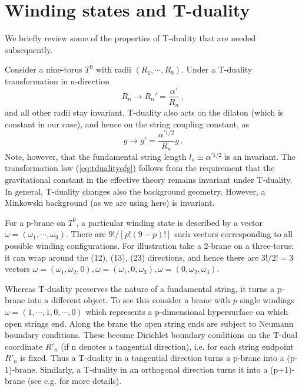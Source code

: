 \documentclass[a4paper,twocolumn,nofootinbib,tightenlines,prd,aps,
               superscriptaddress]{revtex4} %
\newcommand{\al}{\alpha}
\newcommand{\om}{\omega}
\newcommand{\ga}{\gamma}
\newcommand{\cP}{{\cal{P}}}
\begin{document}


\section{Winding states and T-duality}
\label{sec:tduality}

We briefly review some of the properties
of T-duality that are needed subsequently.

Consider a nine-torus $T^9$ with radii $(R_1,\cdots, R_9)$. Under
a T-duality transformation in n-direction
\begin{equation}\label{eq:tdualitydef}
    R_n \rightarrow R_n'=\frac{\al'}{R_n} \, ,
\end{equation}
and  all other radii stay invariant. T-duality also acts on the
dilaton (which is  constant in our case), and hence on the string
coupling constant, as
\begin{equation} \label{eq:tdualityofg}
    g \rightarrow g'=\frac{\al^{'1/2}}{R_n}g \, .
\end{equation}
Note, however, that the fundamental string length $l_s \equiv
\al^{'1/2}$ is an invariant. The transformation law
(\ref{eq:tdualityofg}) follows from the requirement that the
gravitational constant in the effective theory remains invariant
under T-duality. In general, T-duality changes also the background
geometry. However, a Minkowski background (as we are using here)
is invariant.

For a p-brane on $T^9$, a particular winding state is described by
a vector $\om = (\om_1,\cdots,\om_9)$. There are $9! / [p!
(9-p)!]$ such vectors corresponding to all possible winding
configurations. For illustration take a 2-brane on a three-torus:
it can wrap around the (12), (13), (23) directions, and hence
there are $3! / 2! = 3$ vectors $\om = (\om_1,\om_2,0),
\om=(\om_1,0,\om_3), \om=(0,\om_2,\om_3)$.

Whereas T-duality preserves the nature of a fundamental string, it
turns a p-brane into a different object. To see this consider a
brane with $p$ single windings $\om=(1,\cdots,1,0,\cdots,0)$ which
represents a p-dimensional hypersurface on which open strings end.
Along the brane the open string ends are subject to Neumann
boundary conditions. These become Dirichlet boundary conditions on
the T-dual coordinate $R'_n$ (if n denotes a tangential
direction), i.e. for each string endpoint $R'_n$ is fixed. Thus a
T-duality in a tangential direction turns a p-brane into a
(p-1)-brane. Similarly, a T-duality in an orthogonal direction
turns it into a (p+1)-brane (see e.g. \cite{Polchinski:1998rr} for
more details).
\end{document}
